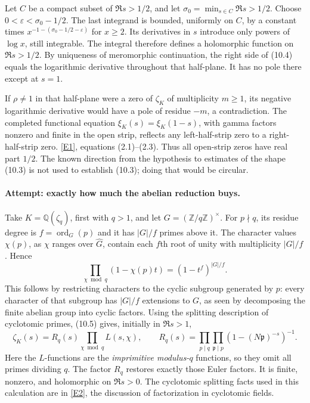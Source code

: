 \documentclass[11pt,a4paper]{article}
\newcommand{\Z}{\mathbb{Z}}
\newcommand{\Q}{\mathbb{Q}}
\newcommand{\eref}[2]{\hyperlink{extra:#1:#2}{[E#2]}}
\begin{document}
Let $C$ be a compact subset of $\Re s>1/2$, and let
$\sigma_0=\min_{s\in C}\Re s>1/2$. Choose
$0<\varepsilon<\sigma_0-1/2$. The last integrand is bounded, uniformly
on $C$, by a constant times
$x^{-1-(\sigma_0-1/2-\varepsilon)}$ for $x\geq2$.
Its derivatives in $s$ introduce only powers of $\log x$, still
integrable. The integral therefore defines a holomorphic function on
$\Re s>1/2$. By uniqueness of meromorphic continuation, the right side
of (10.4) equals the logarithmic derivative throughout that half-plane.
It has no pole there except at $s=1$.

If $\rho\ne1$ in that half-plane were a zero of $\zeta_K$ of multiplicity
$m\geq1$, its negative logarithmic derivative would have a pole of
residue $-m$, a contradiction. The completed functional equation
$\xi_K(s)=\xi_K(1-s)$, with gamma factors nonzero and finite in the
open strip, reflects any left-half-strip zero to a right-half-strip
zero. \eref{30006677}{1}, equations (2.1)--(2.3).
Thus all open-strip zeros have real part $1/2$. The known direction
from the hypothesis to estimates of the shape (10.3) is not used to
establish (10.3); doing that would be circular.

\paragraph{Attempt: exactly how much the abelian reduction buys.}
Take $K=\Q(\zeta_q)$, first with $q>1$, and let
$G=(\Z/q\Z)^\times$. For $p\nmid q$, its residue degree is
$f=\operatorname{ord}_G(p)$ and it has $|G|/f$ primes above it.
The character values $\chi(p)$, as $\chi$ ranges over $\widehat G$,
contain each $f$th root of unity with multiplicity $|G|/f$. Hence
\[
 \prod_{\chi\bmod q}(1-\chi(p)t)
       =(1-t^f)^{|G|/f}. \tag{10.5}
\]
This follows by restricting characters to the cyclic subgroup generated
by $p$: every character of that subgroup has $|G|/f$ extensions to
$G$, as seen by decomposing the finite abelian group into cyclic factors.
Using the splitting description of cyclotomic primes, (10.5) gives,
initially in $\Re s>1$,
\[
 \zeta_K(s)=R_q(s)\prod_{\chi\bmod q}L(s,\chi),\qquad
 R_q(s)=\prod_{p\mid q}\prod_{\mathfrak p\mid p}
              (1-(N\mathfrak p)^{-s})^{-1}. \tag{10.6}
\]
Here the $L$-functions are the \emph{imprimitive modulus-$q$} functions,
so they omit all primes dividing $q$. The factor $R_q$ restores exactly
those Euler factors. It is finite, nonzero, and holomorphic on $\Re s>0$.
The cyclotomic splitting facts used in this calculation are in
\eref{30006677}{2}, the discussion of factorization in cyclotomic fields.
\end{document}
